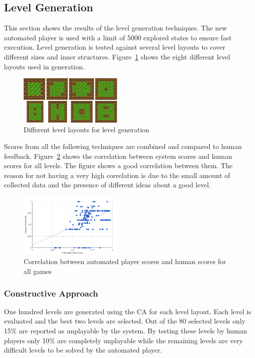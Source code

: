 \documentclass[letterpaper]{article}
\newcommand{\figref}[1]{Figure~\ref{Figure:#1}}
\begin{document}
\subsection{Level Generation}
This section shows the results of the level generation techniques. The new automated player is used with a limit of 5000 explored states to ensure fast execution. Level generation is tested against several level layouts to cover different sizes and inner structures. \figref{levelLayouts} shows the eight different level layouts used in generation.\\\par
\begin{figure}[ht]
  	\centering
    \includegraphics[width=0.45\textwidth]{Images/levelLayouts}
    \caption{Different level layouts for level generation}
    \label{Figure:levelLayouts}
\end{figure}

Scores from all the following techniques are combined and compared to human feedback. \figref{totalCorrelation} shows the correlation between system scores and human scores for all levels. The figure shows a good correlation between them. The reason for not having a very high correlation is due to the small amount of collected data and the presence of different ideas about a good level.

\begin{figure}[ht]
  	\centering
    \includegraphics[width=0.45\textwidth]{Images/totalCorrelation}
    \caption{Correlation between automated player scores and human scores for all games}
    \label{Figure:totalCorrelation}
\end{figure}

\subsubsection{Constructive Approach}
One hundred levels are generated using the CA for each level layout. Each level is evaluated and the best two levels are selected. Out of the 80 selected levels only 15\% are reported as unplayable by the system. By testing these levels by human players only 10\% are completely unplayable while the remaining levels are very difficult levels to be solved by the automated player.
\end{document}
